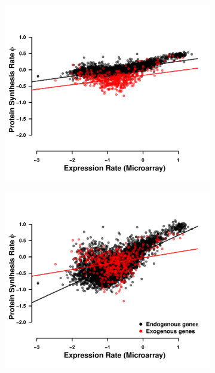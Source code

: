 \documentclass[12pt]{article}
\begin{document}
\begin{figure}[h]
    \centering
    \begin{subfigure}
        \centering
        \includegraphics[width=.45\textwidth]{img/phi_corr_plot_whole_Genome_estim.pdf}
    \end{subfigure}
    \begin{subfigure}
        \centering
        \includegraphics[width=.45\textwidth]{img/phi_corr_plot_split_Genome_estim.pdf}
    \end{subfigure}
    \caption{}
    \label{fig:phi_corr_two_cond}
\end{figure}
\end{document}
